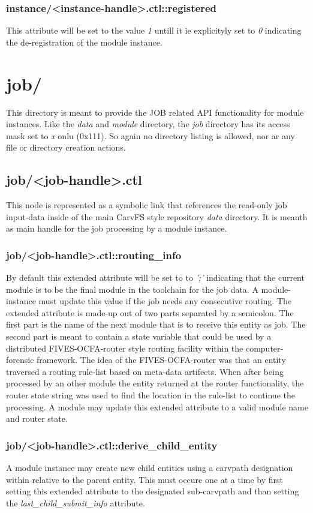 \subsubsection{instance/<instance-handle>.ctl::registered}
This attribute will be set to the value \emph{1} untill it ie explicityly set to \emph{0} indicating the de-registration of the module instance.
\section{job/}
This directory is meant to provide the JOB related API functionality for module instances. Like the \emph{data} and \emph{module} directory, the \emph{job} directory has its access mask set to \emph{x} onlu (0x111). So again no directory listing is allowed, nor ar any file or directory creation actions.
\subsection{job/<job-handle>.ctl}
This node is represented as a symbolic link that references the read-only job input-data inside of the main CarvFS style repository \emph{data} directory. It is meanth as main handle for the job processing by a module instance.
\subsubsection{job/<job-handle>.ctl::routing\_info}
By default this extended attribute will be set to to \emph{';'} indicating that the current module is to be the final module in the toolchain for the job data. A module-instance must update this value if the job needs any consecutive routing. The extended attribute is made-up out of two parts separated by a semicolon. The first part is the name of the next module that is to receive this entity as job. The second part is meant to contain a state variable that could be used by a distributed FIVES-OCFA-router style routing facility within the computer-forensic framework. The idea of the FIVES-OCFA-router was that an entity traversed a routing rule-list based on meta-data artifects. When after being processed by an other module the entity returned at the router functionality, the router state string was used to find the location in the rule-list to continue the processing.
A module may update this extended attribute to a valid module name and router state.
\subsubsection{job/<job-handle>.ctl::derive\_child\_entity}
A module instance may create new child entities using a carvpath designation within relative to the parent entity.
This must occure one at a time by first setting this extended attribute to the designated sub-carvpath and than setting the \emph{last\_child\_submit\_info} attribute.
